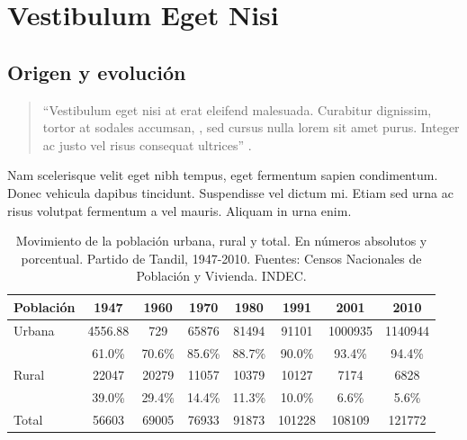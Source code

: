 \chapter{Vestibulum Eget Nisi}
\setcounter{PrimPag}{\theCurrentPage}

\section{Origen y evolución}

\begin{quote}
\enquote{Vestibulum eget nisi at erat eleifend malesuada. Curabitur dignissim, tortor at sodales accumsan, , sed cursus nulla lorem sit amet purus. Integer ac justo vel risus consequat ultrices} \parencite{@6445-LECUN2015}.
\end{quote}

Nam scelerisque velit eget nibh tempus, eget fermentum sapien condimentum. Donec vehicula dapibus tincidunt. Suspendisse vel dictum mi. Etiam sed urna ac risus volutpat fermentum a vel mauris. Aliquam in urna enim.

\begin{table}[!ht]
	\sf\footnotesize\setlength\tabcolsep{4pt}
	\centering
	\begin{tabular}{l | S[table-format=5.2] | S[table-format=5.0] | S[table-format=5.0] | S[table-format=5.0] | S[table-format=6.0] | S[table-format=7.0] | S[table-format=7.0]}
		\toprule
		\textbf{Población} & \textbf{1947} & \textbf{1960} & \textbf{1970} & \textbf{1980} & \textbf{1991} & \textbf{2001} & \textbf{2010} \\
		\midrule
		Urbana & 4556.88 & 729 & 65876 & 81494 & 91101 & 1000935 & 1140944 \\
		& {61.0\%} & {70.6\%} & {85.6\%} & {88.7\%} & {90.0\%} & {93.4\%} & {94.4\%} \\
		\midrule
		Rural & 22047 & 20279 & 11057 & 10379 & 10127 & 7174 & 6828 \\
		& {39.0\%} & {29.4\%} & {14.4\%} & {11.3\%} & {10.0\%} & {6.6\%} & {5.6\%} \\
		\midrule
		Total & 56603 & 69005 & 76933 & 91873 & 101228 & 108109 & 121772 \\
		\bottomrule
	\end{tabular}
	\caption{Movimiento de la población urbana, rural y total. En números absolutos y porcentual. Partido de Tandil, 1947-2010. Fuentes: Censos Nacionales de Población y Vivienda. INDEC.}\label{cap3-1}
\end{table}


